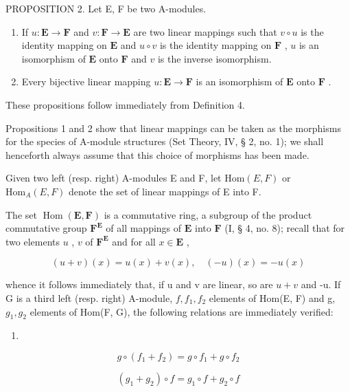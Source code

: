 PROPOSITION 2. Let E, F be two A-modules.

\begin{enumerate}
\def\labelenumi{(\arabic{enumi})}
\item
  If \(u: \mathbf{E} \to \mathbf{F}\) and \(v: \mathbf{F} \to \mathbf{E}\) are two linear mappings such that \(v \circ u\) is the identity mapping on \(\mathbf{E}\) and \(u \circ v\) is the identity mapping on \(\mathbf{F}\) , \(u\) is an isomorphism of \(\mathbf{E}\) onto \(\mathbf{F}\) and \(v\) is the inverse isomorphism.
\item
  Every bijective linear mapping \(u: \mathbf{E} \to \mathbf{F}\) is an isomorphism of \(\mathbf{E}\) onto \(\mathbf{F}\) .
\end{enumerate}

These propositions follow immediately from Definition 4.

Propositions 1 and 2 show that linear mappings can be taken as the morphisms for the species of A-module structures (Set Theory, IV, § 2, no. 1); we shall henceforth always assume that this choice of morphisms has been made.

Given two left (resp. right) A-modules E and F, let \(\text{Hom}(E, F)\) or \(\text{Hom}_{A}(E, F)\) denote the set of linear mappings of E into F.

The set \(\operatorname{Hom}(\mathbf{E},\mathbf{F})\) is a commutative ring, a subgroup of the product commutative group \(\mathbf{F}^{\mathbf{E}}\) of all mappings of \(\mathbf{E}\) into \(\mathbf{F}\) (I, § 4, no. 8); recall that for two elements \(u\) , \(v\) of \(\mathbf{F}^{\mathbf{E}}\) and for all \(x\in\mathbf{E}\) ,

\[
(u + v) (x) = u (x) + v (x), \quad (- u) (x) = - u (x)
\]

whence it follows immediately that, if u and v are linear, so are \(u + v\) and -u. If G is a third left (resp. right) A-module, \(f, f_{1}, f_{2}\) elements of Hom(E, F) and g, \(g_{1}, g_{2}\) elements of Hom(F, G), the following relations are immediately verified:

\begin{enumerate}
\def\labelenumi{(\arabic{enumi})}
\setcounter{enumi}{5}
\tightlist
\item
\end{enumerate}

\[
g \circ (f _ {1} + f _ {2}) = g \circ f _ {1} + g \circ f _ {2}\tag{7}
\]

\[
\left(g _ {1} + g _ {2}\right) \circ f = g _ {1} \circ f + g _ {2} \circ f\tag{8}
\]


